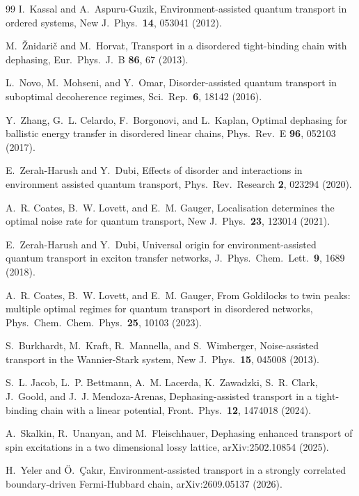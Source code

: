 \documentclass[aps,pre,preprint,floatfix]{revtex4-2}
\begin{document}
\begin{thebibliography}{99}
I.~Kassal and A.~Aspuru-Guzik,
Environment-assisted quantum transport in ordered systems,
New J.\ Phys.\ \textbf{14}, 053041 (2012).

M.~\v{Z}nidari\v{c} and M.~Horvat,
Transport in a disordered tight-binding chain with dephasing,
Eur.\ Phys.\ J.~B \textbf{86}, 67 (2013).

L.~Novo, M.~Mohseni, and Y.~Omar,
Disorder-assisted quantum transport in suboptimal decoherence regimes,
Sci.\ Rep.\ \textbf{6}, 18142 (2016).

Y.~Zhang, G.~L. Celardo, F.~Borgonovi, and L.~Kaplan,
Optimal dephasing for ballistic energy transfer in disordered linear chains,
Phys.\ Rev.~E \textbf{96}, 052103 (2017).

E.~Zerah-Harush and Y.~Dubi,
Effects of disorder and interactions in environment assisted quantum
transport,
Phys.\ Rev.\ Research \textbf{2}, 023294 (2020).

A.~R. Coates, B.~W. Lovett, and E.~M. Gauger,
Localisation determines the optimal noise rate for quantum transport,
New J.\ Phys.\ \textbf{23}, 123014 (2021).

E.~Zerah-Harush and Y.~Dubi,
Universal origin for environment-assisted quantum transport in exciton
transfer networks,
J.~Phys.\ Chem.\ Lett.\ \textbf{9}, 1689 (2018).

A.~R. Coates, B.~W. Lovett, and E.~M. Gauger,
From Goldilocks to twin peaks: multiple optimal regimes for quantum transport
in disordered networks,
Phys.\ Chem.\ Chem.\ Phys.\ \textbf{25}, 10103 (2023).

S.~Burkhardt, M.~Kraft, R.~Mannella, and S.~Wimberger,
Noise-assisted transport in the Wannier-Stark system,
New J.\ Phys.\ \textbf{15}, 045008 (2013).

S.~L. Jacob, L.~P. Bettmann, A.~M. Lacerda, K.~Zawadzki, S.~R. Clark,
J.~Goold, and J.~J. Mendoza-Arenas,
Dephasing-assisted transport in a tight-binding chain with a linear potential,
Front.\ Phys.\ \textbf{12}, 1474018 (2024).

A.~Skalkin, R.~Unanyan, and M.~Fleischhauer,
Dephasing enhanced transport of spin excitations in a two dimensional lossy
lattice,
arXiv:2502.10854 (2025).

H.~Yeler and \"{O}.~\c{C}ak{\i}r,
Environment-assisted transport in a strongly correlated boundary-driven
Fermi-Hubbard chain,
arXiv:2609.05137 (2026).


\end{thebibliography}
\end{document}
